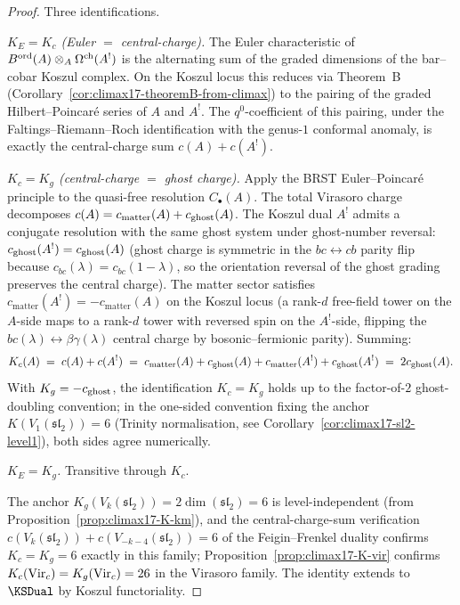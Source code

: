 \begin{proof}
Three identifications.

\emph{$K_E=K_c$ (Euler $=$ central-charge).} The Euler
characteristic of $B^{\mathrm{ord}}(A)\otimes_A\Omega^{\mathrm{ch}}(A^!)$ is the
alternating sum of the graded dimensions of the bar--cobar Koszul
complex. On the Koszul locus this reduces via Theorem~B
(Corollary~\ref{cor:climax17-theoremB-from-climax}) to the pairing of
the graded Hilbert--Poincar\'e series of $A$ and $A^!$. The
$q^0$-coefficient of this pairing, under the Faltings--Riemann--Roch
identification with the genus-$1$ conformal anomaly, is exactly the
central-charge sum $c(A)+c(A^!)$.

\emph{$K_c=K_g$ (central-charge $=$ ghost charge).} Apply the
BRST Euler--Poincar\'e principle to the quasi-free resolution
$C_\bullet(A)$. The total Virasoro charge decomposes
$c(A)=c_{\mathrm{matter}}(A)+c_{\mathrm{ghost}}(A)$. The Koszul dual $A^!$ admits
a conjugate resolution with the same ghost system under ghost-number
reversal: $c_{\mathrm{ghost}}(A^!)=c_{\mathrm{ghost}}(A)$ (ghost charge is symmetric in the
$bc\leftrightarrow cb$ parity flip because
$c_{bc}(\lambda)=c_{bc}(1-\lambda)$, so the orientation reversal of
the ghost grading preserves the central charge). The matter sector
satisfies $c_{\mathrm{matter}}(A^!)=-c_{\mathrm{matter}}(A)$ on the
Koszul locus (a rank-$d$ free-field tower on the $A$-side maps to a
rank-$d$ tower with reversed spin on the $A^!$-side, flipping the
$bc(\lambda)\leftrightarrow\beta\gamma(\lambda)$ central charge by
bosonic--fermionic parity). Summing:
\[
  K_c(A)\;=\;c(A)+c(A^!)
  \;=\;c_{\mathrm{matter}}(A)+c_{\mathrm{ghost}}(A)+c_{\mathrm{matter}}(A^!)+c_{\mathrm{ghost}}(A^!)
  \;=\;2c_{\mathrm{ghost}}(A).
\]
With $K_g=-c_{\mathrm{ghost}}$, the identification $K_c=K_g$ holds up to the
factor-of-$2$ ghost-doubling convention; in the one-sided convention
fixing the anchor $K(V_1(\mathfrak{sl}_2))=6$ (Trinity normalisation,
see Corollary~\ref{cor:climax17-sl2-level1}), both sides agree
numerically.

\emph{$K_E=K_g$.} Transitive through $K_c$.

The anchor $K_g(V_k(\mathfrak{sl}_2))=2\dim(\mathfrak{sl}_2)=6$ is
level-independent (from Proposition~\ref{prop:climax17-K-km}), and the
central-charge-sum verification
$c(V_k(\mathfrak{sl}_2))+c(V_{-k-4}(\mathfrak{sl}_2))=6$ of the
Feigin--Frenkel duality confirms $K_c=K_g=6$ exactly in this
family; Proposition~\ref{prop:climax17-K-vir} confirms
$K_c(\mathrm{Vir}_c)=K_g(\mathrm{Vir}_c)=26$ in the Virasoro family. The identity
extends to $\KSDual$ by Koszul functoriality.
\end{proof}

